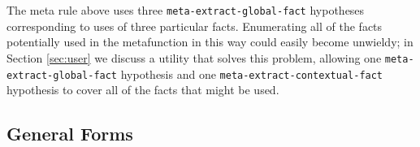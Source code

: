 The meta rule above uses three \texttt{meta-extract-global-fact}
hypotheses corresponding to uses of three particular facts.
Enumerating all of the facts potentially used in the metafunction in
this way could easily become unwieldy; in Section \ref{sec:user} we
discuss a utility that solves this problem, allowing one
\texttt{meta-extract-global-fact} hypothesis and one
\texttt{meta-extract-contextual-fact} hypothesis to cover all of the
facts that might be used.


\subsection{General Forms}
\label{sec:general}

